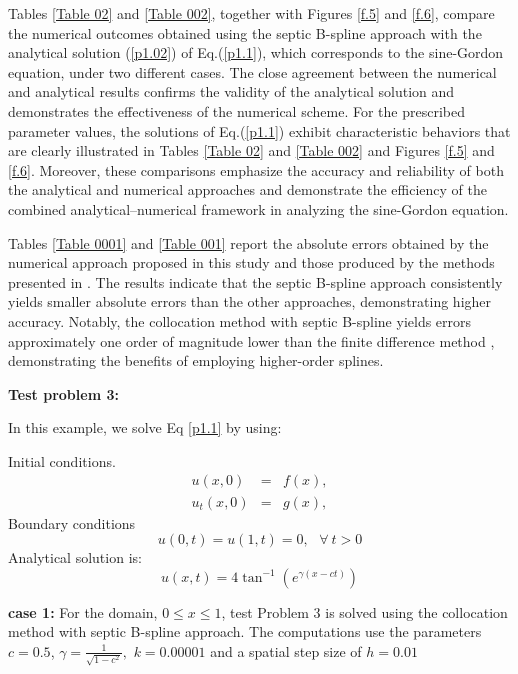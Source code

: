 \documentclass[10pt,letterpaper,twoside]{article}
\begin{document}
Tables \ref{Table 02} and \ref{Table 002}, together with Figures \ref{f.5} and \ref{f.6}, compare the numerical outcomes obtained using the septic B-spline approach with the analytical solution (\ref{p1.02}) of Eq.(\ref{p1.1}), which corresponds to the sine-Gordon equation, under two different cases. The close agreement between the numerical and analytical results confirms the validity of the analytical solution and demonstrates the effectiveness of the numerical scheme. For the prescribed parameter values, the solutions of Eq.(\ref{p1.1}) exhibit characteristic behaviors that are clearly illustrated in Tables \ref{Table 02} and \ref{Table 002} and Figures \ref{f.5} and \ref{f.6}. Moreover, these comparisons emphasize the accuracy and reliability of both the analytical and numerical approaches and demonstrate the efficiency of the combined analytical--numerical framework in analyzing the sine-Gordon equation.

Tables \ref{Table 0001} and \ref{Table 001} report the absolute errors obtained by the numerical approach proposed in this study and those produced by the methods presented in \cite{24,38}. The results indicate that the septic B-spline approach consistently yields smaller absolute errors than the other approaches, demonstrating higher accuracy. Notably, the collocation method with septic B-spline yields errors approximately one order of magnitude lower than the finite difference method \cite{24}, demonstrating the benefits of employing higher-order splines.

\textbf{Test problem 3:}

In this example, we solve Eq \ref{p1.1} by using:

Initial conditions.
\begin{eqnarray*}
 u(x,0) &=&f(x), \\
 u_{t}(x,0) &=&g(x),
\end{eqnarray*}
Boundary conditions
\begin{equation*}
 u(0,t)=u(1,t)=0,\ \ \ \forall\ t>0
\end{equation*}
Analytical solution is: \cite{39}
\begin{equation}\label{p1.002}
 u(x,t)=4 \tan^{-1}(e^{\gamma(x-c t)})
\end{equation}

\textbf{case 1:} For the domain, $0\leq x\leq 1$, test Problem 3 is solved using the collocation method with septic B-spline approach. The computations use the parameters $c = 0.5$, $\gamma= \frac{1}{\sqrt{1-c^2}},$ $ k = 0.00001 $ and a spatial step size of $ h = 0.01 $
\end{document}
